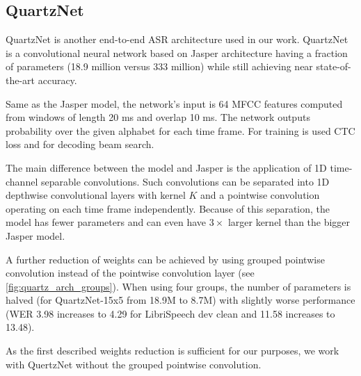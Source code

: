 \subsection{QuartzNet}

QuartzNet  is another end-to-end ASR architecture used in our work. QuartzNet is a convolutional neural network based on Jasper  architecture having a fraction of parameters (18.9 million versus 333 million) while still achieving near state-of-the-art accuracy.

Same as the Jasper model, the network's input is 64 MFCC features computed from windows of length 20 ms and overlap 10 ms. The network outputs probability over the given alphabet for each time frame. For training is used CTC loss and for decoding beam search.

The main difference between the model and Jasper is the application of 1D time-channel separable convolutions.  Such convolutions can be separated into 1D depthwise convolutional layers with kernel $K$ and a pointwise convolution operating on each time frame independently. Because of this separation, the model has fewer parameters and can even have $3 \times$ larger kernel than the bigger Jasper model.

A further reduction of weights can be achieved by using grouped pointwise convolution instead of the pointwise convolution layer (see  \cref{fig:quartz_arch_groups}). When using four groups, the number of parameters is halved (for QuartzNet-15x5 from 18.9M to 8.7M) with slightly worse performance (WER 3.98 increases to 4.29 for LibriSpeech dev clean and 11.58 increases to 13.48).

As the first described weights reduction is sufficient for our purposes, we work with QuertzNet without the grouped pointwise convolution.

